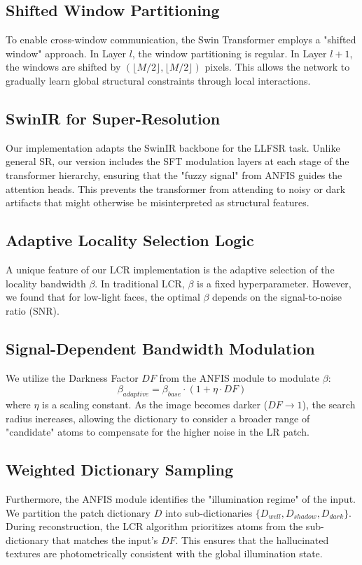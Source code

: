 \subsection{Shifted Window Partitioning}
To enable cross-window communication, the Swin Transformer employs a "shifted window" approach. In Layer $l$, the window partitioning is regular. In Layer $l+1$, the windows are shifted by $(\lfloor M/2 \rfloor, \lfloor M/2 \rfloor)$ pixels. This allows the network to gradually learn global structural constraints through local interactions.

\subsection{SwinIR for Super-Resolution}
Our implementation adapts the SwinIR backbone for the LLFSR task. Unlike general SR, our version includes the SFT modulation layers at each stage of the transformer hierarchy, ensuring that the "fuzzy signal" from ANFIS guides the attention heads. This prevents the transformer from attending to noisy or dark artifacts that might otherwise be misinterpreted as structural features.

\subsection{Adaptive Locality Selection Logic}
A unique feature of our LCR implementation is the adaptive selection of the locality bandwidth $\beta$. In traditional LCR, $\beta$ is a fixed hyperparameter. However, we found that for low-light faces, the optimal $\beta$ depends on the signal-to-noise ratio (SNR).

\subsection{Signal-Dependent Bandwidth Modulation}
We utilize the Darkness Factor $DF$ from the ANFIS module to modulate $\beta$:
\begin{equation}
    \beta_{adaptive} = \beta_{base} \cdot (1 + \eta \cdot DF)
\end{equation}
where $\eta$ is a scaling constant. As the image becomes darker ($DF \to 1$), the search radius increases, allowing the dictionary to consider a broader range of "candidate" atoms to compensate for the higher noise in the LR patch.

\subsection{Weighted Dictionary Sampling}
Furthermore, the ANFIS module identifies the "illumination regime" of the input. We partition the patch dictionary $D$ into sub-dictionaries $\{D_{well}, D_{shadow}, D_{dark}\}$. During reconstruction, the LCR algorithm prioritizes atoms from the sub-dictionary that matches the input's $DF$. This ensures that the hallucinated textures are photometrically consistent with the global illumination state.

